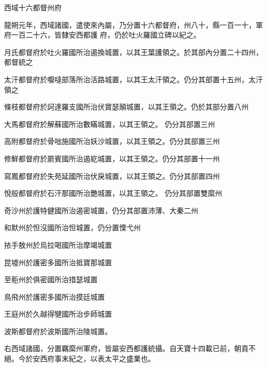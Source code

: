 \begin{pinyinscope}
 西域十六都督州府



 龍朔元年，西域諸國，遣使來內屬，乃分置十六都督府，州八十，縣一百一十，軍府一百二十六，皆隸安西都護
 府，仍於吐火羅國立碑以紀之。



 月氏都督府於吐火羅國所治遏換城置，以其王葉護領之。於其部內分置二十四州，都督統之



 太汗都督府於嚈噠部落所治活路城置，以其王太汗領之。仍分其部置十五州，太汗領之



 條枝都督府於訶達羅支國所治伏寶瑟顛城置，以其王領之。仍於其部分置八州



 大馬都督府於解蘇國所治數瞞城置，以其王領之。
 仍分其部置三州



 高附都督府於骨咄施國所治妖沙城置，以其王領之。仍分其部置三州



 修鮮都督府於罽賓國所治遏紇城置，以其王領之。仍分其部置十一州



 寫鳳都督府於失苑延國所治伏戾城置，以其王領之。仍分其部置四州



 悅般都督府於石汗那國所治艷城置，以其王領之。
 仍分其部置雙縻州



 奇沙州於護特健國所治遏密城置，仍分其部置沛薄、大秦二州



 和默州於怛沒國所治怛城置，仍分置慄弋州



 挔手敖州於烏拉喝國所治摩竭城置



 昆墟州於護密多國所治抵寶那城置



 至秬州於俱密國所治措瑟城置



 鳥飛州於護密多國所治摸廷城置



 王庭州於久越得犍國所治步師城置



 波斯都督府於波斯國所治陵城置。



 右西域諸國，分置羈縻州軍府，皆屬安西都護統攝。自天寶十四載已前，朝貢不絕。今於安西府事末紀之，以表太平之盛業也。



\end{pinyinscope}
